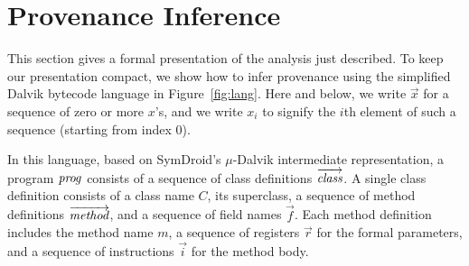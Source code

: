 


\section{Provenance Inference}
\label{sec:technical}
%
This section gives a formal presentation of the analysis just
described. To keep our presentation compact, we show how to infer
provenance using the simplified Dalvik bytecode language in
Figure~\ref{fig:lang}. Here and below, we write $\vec{x}$ for a
sequence of zero or more $x$'s, and we write $x_i$ to signify the
$i$th element of such a sequence (starting from index 0).

In this language, based on SymDroid's
$\mu$-Dalvik intermediate representation, a program $\mathit{prog}$
consists of a sequence of class definitions $\overrightarrow{\mathit{class}}$.
A single class definition consists of a class name $C$, its superclass,
a sequence of method definitions $\overrightarrow{\mathit{method}}$, and a sequence
of field names $\vec{f}$. Each method definition includes the method
name $m$, a sequence of registers $\vec{r}$ for the
formal parameters, and a sequence of instructions $\vec{i}$ for the
method body.

